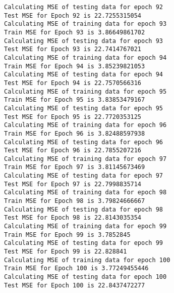 \documentclass{article}
\begin{document}
\begin{Verbatim}[commandchars=\\\{\}]
Calculating MSE of testing data for epoch 92
Test MSE for Epoch 92 is 22.7255315054
Calculating MSE of training data for epoch 93
Train MSE for Epoch 93 is 3.86649861702
Calculating MSE of testing data for epoch 93
Test MSE for Epoch 93 is 22.7414767021
Calculating MSE of training data for epoch 94
Train MSE for Epoch 94 is 3.85239821053
Calculating MSE of testing data for epoch 94
Test MSE for Epoch 94 is 22.7570566316
Calculating MSE of training data for epoch 95
Train MSE for Epoch 95 is 3.83853479167
Calculating MSE of testing data for epoch 95
Test MSE for Epoch 95 is 22.7720353125
Calculating MSE of training data for epoch 96
Train MSE for Epoch 96 is 3.82488597938
Calculating MSE of testing data for epoch 96
Test MSE for Epoch 96 is 22.7855207216
Calculating MSE of training data for epoch 97
Train MSE for Epoch 97 is 3.81145673469
Calculating MSE of testing data for epoch 97
Test MSE for Epoch 97 is 22.7998835714
Calculating MSE of training data for epoch 98
Train MSE for Epoch 98 is 3.79824666667
Calculating MSE of testing data for epoch 98
Test MSE for Epoch 98 is 22.8143035354
Calculating MSE of training data for epoch 99
Train MSE for Epoch 99 is 3.7852845
Calculating MSE of testing data for epoch 99
Test MSE for Epoch 99 is 22.828841
Calculating MSE of training data for epoch 100
Train MSE for Epoch 100 is 3.77249455446
Calculating MSE of testing data for epoch 100
Test MSE for Epoch 100 is 22.8437472277
    \end{Verbatim}
\end{document}
